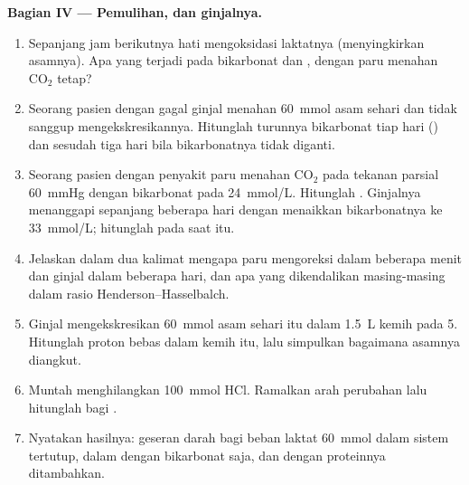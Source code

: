 \begin{problem}
\medskip
\noindent\textbf{Bagian IV --- Pemulihan, dan ginjalnya.}
\begin{enumerate}[resume]
  \item Sepanjang jam berikutnya hati mengoksidasi laktatnya
        (menyingkirkan asamnya). Apa yang terjadi pada bikarbonat dan
        , dengan paru menahan $\mathrm{CO_2}$ tetap?
  \item Seorang pasien dengan gagal ginjal menahan \qty{60}{mmol} asam
        sehari dan tidak sanggup mengekskresikannya. Hitunglah
        turunnya bikarbonat tiap hari () dan  sesudah
        tiga hari bila bikarbonatnya tidak diganti.
  \item Seorang pasien dengan penyakit paru menahan $\mathrm{CO_2}$
        pada tekanan parsial \qty{60}{mmHg} dengan bikarbonat pada
        \qty{24}{mmol/L}. Hitunglah . Ginjalnya menanggapi
        sepanjang beberapa hari dengan menaikkan bikarbonatnya ke
        \qty{33}{mmol/L}; hitunglah  pada saat itu.
  \item Jelaskan dalam dua kalimat mengapa paru mengoreksi  dalam
        beberapa menit dan ginjal dalam beberapa hari, dan apa yang
        dikendalikan masing-masing dalam rasio
        Henderson--Hasselbalch.
  \item Ginjal mengekskresikan \qty{60}{mmol} asam sehari itu dalam
        \qty{1.5}{L} kemih pada  5. Hitunglah proton bebas dalam
        kemih itu, lalu simpulkan bagaimana asamnya diangkut.
  \item Muntah menghilangkan \qty{100}{mmol} HCl. Ramalkan arah
        perubahan  lalu hitunglah bagi .
  \item Nyatakan hasilnya: geseran  darah bagi beban laktat
        \qty{60}{mmol} dalam sistem tertutup, dalam 
        dengan bikarbonat saja, dan dengan  proteinnya
        ditambahkan.
\end{enumerate}
\end{problem}
